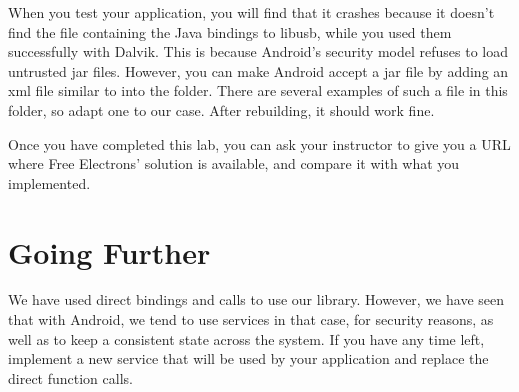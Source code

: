 When you test your application, you will find that it 
crashes because it doesn't find the  file containing the Java
bindings to libusb, while you used them successfully with
Dalvik. This is because Android's security model refuses to load
untrusted jar files. However, you can make Android accept a jar file
by adding an xml file similar to  into
the  folder. There are several examples
of such a file in this folder, so adapt one to our case. After
rebuilding, it should work fine.

Once you have completed this lab, you can ask your instructor to
give you a URL where Free Electrons' solution is available, and compare
it with what you implemented.

\section{Going Further}

We have used direct bindings and calls to use our library. However, we
have seen that with Android, we tend to use services in that case, for
security reasons, as well as to keep a consistent state across the
system. If you have any time left, implement a new service that will
be used by your application and replace the direct function calls.
